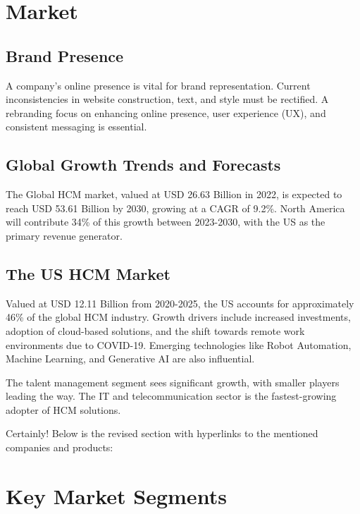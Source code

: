 \documentclass[
  a4paper,
]{book}
\begin{document}
\hypertarget{market}{%
\section{Market}\label{market}}

\hypertarget{brand-presence}{%
\subsection{Brand Presence}\label{brand-presence}}

A company's online presence is vital for brand representation. Current
inconsistencies in website construction, text, and style must be
rectified. A rebranding focus on enhancing online presence, user
experience (UX), and consistent messaging is essential.

\hypertarget{global-growth-trends-and-forecasts}{%
\subsection{Global Growth Trends and
Forecasts}\label{global-growth-trends-and-forecasts}}

The Global HCM market, valued at USD 26.63 Billion in 2022, is expected
to reach USD 53.61 Billion by 2030, growing at a CAGR of 9.2\%. North
America will contribute 34\% of this growth between 2023-2030, with the
US as the primary revenue generator.

\hypertarget{the-us-hcm-market}{%
\subsection{The US HCM Market}\label{the-us-hcm-market}}

Valued at USD 12.11 Billion from 2020-2025, the US accounts for
approximately 46\% of the global HCM industry. Growth drivers include
increased investments, adoption of cloud-based solutions, and the shift
towards remote work environments due to COVID-19. Emerging technologies
like Robot Automation, Machine Learning, and Generative AI are also
influential.

The talent management segment sees significant growth, with smaller
players leading the way. The IT and telecommunication sector is the
fastest-growing adopter of HCM solutions.

Certainly! Below is the revised section with hyperlinks to the mentioned
companies and products:

\hypertarget{key-market-segments}{%
\section{Key Market Segments}\label{key-market-segments}}
\end{document}
